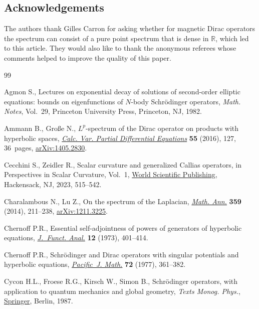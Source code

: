 \documentclass[pdftex]{sigma}
\numberwithin{equation}{section}
\begin{document}
\subsection*{Acknowledgements} The authors thank Gilles Carron for asking whether for magnetic Dirac operators the spectrum can consist of a pure point spectrum that is dense in ${\mathbb R}$, which led to this article. They would also like to thank the anonymous referees whose comments helped to improve the quality of this paper.

\begin{thebibliography}{99}
\footnotesize\itemsep=0pt

Agmon S., Lectures on exponential decay of solutions of second-order elliptic
 equations: bounds on eigenfunctions of {$N$}-body {S}chr\"odinger operators,
 \textit{Math. Notes}, Vol.~29, Princeton University Press, Princeton, NJ,
 1982.

Ammann B., Gro{\ss}e N., {$L^p$}-spectrum of the {D}irac operator on products
 with hyperbolic spaces, \href{https://doi.org/10.1007/s00526-016-1046-z}{\textit{Calc. Var. Partial Differential Equations}}
 \textbf{55} (2016), 127, 36~pages, \href{https://arxiv.org/abs/1405.2830}{arXiv:1405.2830}.

Cecchini S., Zeidler R., Scalar curvature and generalized {C}allias operators,
 in Perspectives in {S}calar {C}urvature, Vol.~1, \href{https://doi.org/10.1142/9789811273223_0002}{World Scientific Publishing},
 Hackensack, NJ, 2023, 515--542.

Charalambous N., Lu Z., On the spectrum of the {L}aplacian, \href{https://doi.org/10.1007/s00208-013-1000-8}{\textit{Math. Ann.}}
 \textbf{359} (2014), 211--238, \href{https://arxiv.org/abs/1211.3225}{arXiv:1211.3225}.

Chernoff P.R., Essential self-adjointness of powers of generators of hyperbolic
 equations, \href{https://doi.org/10.1016/0022-1236(73)90003-7}{\textit{J.~Funct. Anal.}} \textbf{12} (1973), 401--414.

Chernoff P.R., Schr\"odinger and {D}irac operators with singular potentials and
 hyperbolic equations, \href{https://doi.org/10.2140/pjm.1977.72.361}{\textit{Pacific~J. Math.}} \textbf{72} (1977), 361--382.

Cycon H.L., Froese R.G., Kirsch W., Simon B., Schr\"odinger operators, with
 application to quantum mechanics and global geometry, \textit{Texts Monog. Phys.},
 \href{https://doi.org/10.1007/978-3-540-77522-5}{Springer}, Berlin, 1987.


\end{thebibliography}
\end{document}
